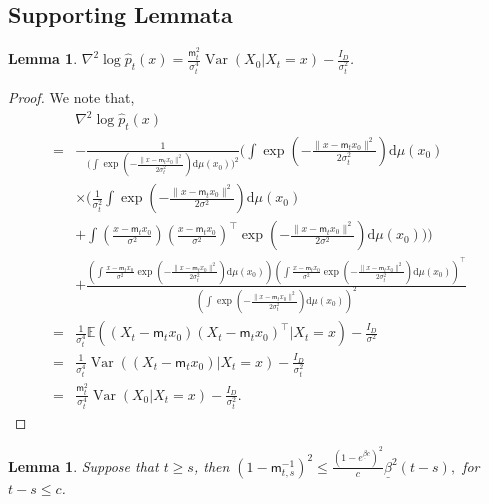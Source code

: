 \documentclass[12pts]{article}
\newtheorem{lemma}[defn]{Lemma}%
\newcommand{\diff}{\mathrm{d}}
\newcommand{\E}{\mathbb{E}}
\newcommand{\hp}{\hat{p}}
\begin{document}
\subsection{Supporting Lemmata}
\begin{lemma}\label{lem_h5}
    $\nabla^2 \log \hp_t(x) = \frac{\mathsf{m}_t ^2 }{\sigma_t^4} \operatorname{Var}\left(X_0 \big| X_t =x\right) - \frac{I_D}{\sigma_t^2}$.
\end{lemma}
\begin{proof}
     We note that,
    \begingroup
    \allowdisplaybreaks
    \begin{align*}
    & \nabla^2 \log \hp_t(x) \\
    = & -\frac{1}{{\bigg(\int \exp\left(-\frac{\|x- \mathsf{m}_t x_0\|^2}{2 \sigma_t^2}\right) \diff  \mu(x_0)\bigg)^2}} \Bigg(\int \exp\left(-\frac{\|x- \mathsf{m}_t x_0\|^2}{2 \sigma_t^2}\right) \diff  \mu(x_0) \\
    & \times \bigg( \frac{1}{\sigma_t^2}\int \exp\left(-\frac{\|x- \mathsf{m}_t x_0\|^2}{2 \sigma^2}\right) \diff  \mu(x_0) \\
    & + \int \left(\frac{x- \mathsf{m}_t x_0}{\sigma^2}\right) \left(\frac{x- \mathsf{m}_t x_0}{\sigma^2}\right)^\top \exp\left(-\frac{\|x- \mathsf{m}_t x_0\|^2}{2 \sigma^2}\right) \diff  \mu(x_0)\bigg)\Bigg)\\
    & +  \frac{\left(\int \frac{x-\mathsf{m}_t x_0}{\sigma^2}\exp\left(-\frac{\|x- \mathsf{m}_t x_0\|^2}{2 \sigma_t^2}\right) \diff  \mu(x_0)\right) \left(\int \frac{x- \mathsf{m}_t x_0}{\sigma^2}\exp\left(-\frac{\|x-\mathsf{m}_t x_0\|^2}{2 \sigma_t^2}\right) \diff  \mu(x_0)\right)^\top }{\left(\int \exp\left(-\frac{\|x-\mathsf{m}_t x_0\|^2}{2 \sigma_t^2}\right) \diff  \mu(x_0)\right)^2}\\
    = & \frac{1}{\sigma_t^4}\E \left((X_t- \mathsf{m}_t x_0)(X_t- \mathsf{m}_t x_0)^\top \big| X_t =x\right) - \frac{I_D}{\sigma^2}\\
    = & \frac{1}{\sigma_t^4} \operatorname{Var}\left((X_t- \mathsf{m}_t x_0)\big| X_t =x\right) - \frac{I_D}{\sigma_t^2}\\
    = &  \frac{\mathsf{m}_t ^2 }{\sigma_t^4} \operatorname{Var}\left(X_0 \big| X_t =x\right) - \frac{I_D}{\sigma_t^2}.
\end{align*}
\endgroup
\end{proof}
\begin{lemma}\label{lem6}
    Suppose that $t \ge s$, then \(\left(1-\mathsf{m}_{t,s}^{-1}\right)^2 \le \frac{(1-e^{\underline{\beta} c})^2}{c} \underline{\beta}^2 (t-s), \) for $t-s \le c$.
\end{lemma}
\end{document}

